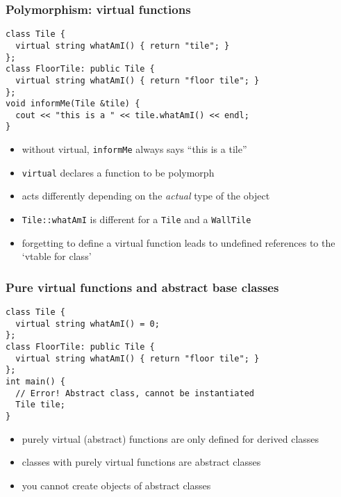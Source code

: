\documentclass{slides}
\begin{document}
\begin{frame}[fragile]
  \frametitle{Polymorphism: virtual functions}

\begin{lstlisting}[emph={virtual}]
class Tile {
  virtual string whatAmI() { return "tile"; }
};
class FloorTile: public Tile {
  virtual string whatAmI() { return "floor tile"; }
};
void informMe(Tile &tile) {
  cout << "this is a " << tile.whatAmI() << endl;
}
\end{lstlisting}

\begin{itemize}
\item without virtual, \lstinline[style=inline]!informMe! always says ``this is a tile''
\item \lstinline!virtual! declares a function to be \alert{polymorph}
\item acts differently depending on the \emph{actual} type of the object
\item \lstinline!Tile::whatAmI! is different for a
	\lstinline!Tile! and a \lstinline!WallTile!
\item forgetting to define a virtual function leads to undefined
      references to the `vtable for class'
\end{itemize}
\end{frame}

\begin{frame}[fragile]
  \frametitle{Pure virtual functions and abstract base classes}

\begin{lstlisting}
class Tile {
  virtual string whatAmI() = 0;
};
class FloorTile: public Tile {
  virtual string whatAmI() { return "floor tile"; }
};
int main() {
  // Error! Abstract class, cannot be instantiated
  Tile tile;
}
\end{lstlisting}

    \begin{itemize}
    \item purely virtual (abstract) functions are only defined for derived classes
    \item classes with purely virtual functions are \alert{abstract}
      classes
    \item you cannot create objects of abstract classes
    \end{itemize}
\end{frame}
\end{document}
